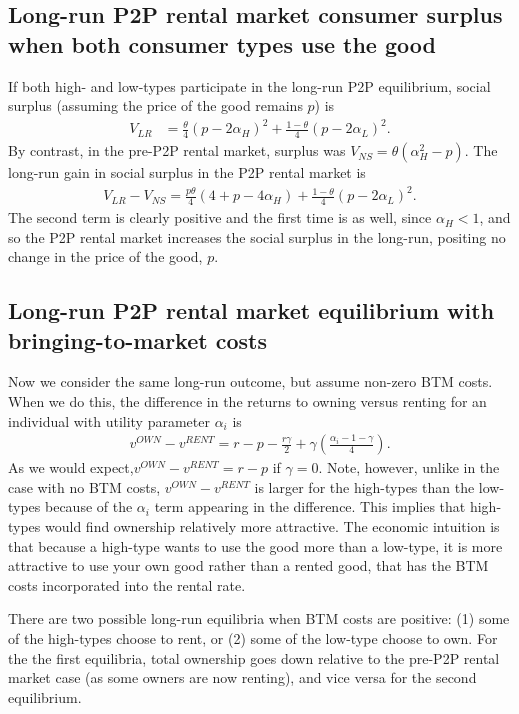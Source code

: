 \documentclass[11pt]{article}
\begin{document}
\subsection{Long-run P2P rental market consumer surplus when both consumer types use the good} 
If both high- and low-types participate in the long-run P2P equilibrium, social surplus (assuming the price of the good remains $p$) is 
\begin{align} 
V_{LR} & = \frac{\theta}{4}(p - 2\alpha_H)^2 + \frac{1-\theta}{4}(p - 2\alpha_L)^2.
\end{align} 
By contrast, in the pre-P2P rental market, surplus was $V_{NS} = \theta(\alpha_H^2 - p)$.  
The long-run gain in social surplus in the P2P rental market is  
\begin{align}
V_{LR} - V_{NS} = \frac{p\theta}{4}(4 + p - 4 \alpha_H) + \frac{1-\theta}{4}(p - 2\alpha_L)^2. 
\end{align}
The second term is clearly positive and the first time is as well, since $\alpha_H < 1$, and so the P2P rental market increases the social surplus in the long-run, positing no change in the price of the good, $p$. 

\subsection{Long-run P2P rental market equilibrium with bringing-to-market costs}
Now we consider the same long-run outcome, but assume non-zero BTM costs.
When we do this, the difference in the returns to owning versus renting for an individual with utility parameter $\alpha_i$  is 
\begin{align}
  v^{OWN} - v^{RENT} = r - p - \frac{r\gamma}{2} + \gamma \left( \frac{\alpha_i - 1 - \gamma}{4} \right). 
\end{align}
As we would expect,$v^{OWN} - v^{RENT} = r - p$ if $\gamma = 0$. 
Note, however, unlike in the case with no BTM costs, $v^{OWN} - v^{RENT}$ is larger for the high-types than the low-types because of the $\alpha_i$ term appearing in the difference.
This implies that high-types would find ownership relatively more attractive.
The economic intuition is that because a high-type wants to use the good more than a low-type, it is more attractive to use your own good rather than a rented good, that has the BTM costs incorporated into the rental rate. 

There are two possible long-run equilibria when BTM costs are positive:
(1) some of the high-types choose to rent, or
(2) some of the low-type choose to own. 
For the the first equilibria, total ownership goes down relative to the pre-P2P rental market case (as some owners are now renting), and vice versa for the second equilibrium. 
\end{document}
